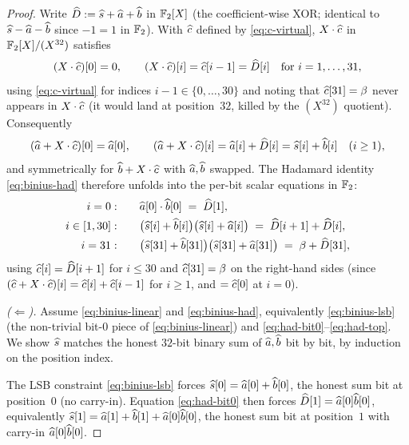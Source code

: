 \begin{proof}
Write $\widehat{D} := \widehat{s} + \widehat{a} + \widehat{b}$ in $\mathbb{F}_2[X]$ (the
coefficient-wise XOR; identical to $\widehat{s} - \widehat{a} - \widehat{b}$ since
$-1 = 1$ in $\mathbb{F}_2$). With $\widehat{c}$ defined by \eqref{eq:c-virtual},
$X\cdot\widehat{c}$ in $\mathbb{F}_2[X]/(X^{32})$ satisfies
\begin{equation}\label{eq:xc-bits}
(X\cdot\widehat{c})[0] = 0, \qquad
(X\cdot\widehat{c})[i] = \widehat{c}[i-1] = \widehat{D}[i] \quad \text{for } i = 1,\dots,31,
\end{equation}
using \eqref{eq:c-virtual} for indices $i-1 \in \{0,\dots,30\}$ and
noting that $\widehat{c}[31] = \beta$ never appears in $X\cdot\widehat{c}$ (it
would land at position~$32$, killed by the $(X^{32})$ quotient).
Consequently
\begin{equation*}
(\widehat{a} + X\cdot\widehat{c})[0] = \widehat{a}[0], \qquad
(\widehat{a} + X\cdot\widehat{c})[i] = \widehat{a}[i] + \widehat{D}[i] = \widehat{s}[i] + \widehat{b}[i]
\quad (i \geq 1),
\end{equation*}
and symmetrically for $\widehat{b} + X\cdot\widehat{c}$ with $\widehat{a}, \widehat{b}$
swapped. The Hadamard identity \eqref{eq:binius-had} therefore unfolds
into the per-bit scalar equations in $\mathbb{F}_2$:
\begin{align}
i = 0:&\qquad \widehat{a}[0]\cdot\widehat{b}[0] \;=\; \widehat{D}[1], \label{eq:had-bit0}\\
i \in [1, 30]:&\qquad \bigl(\widehat{s}[i]+\widehat{b}[i]\bigr)\bigl(\widehat{s}[i]+\widehat{a}[i]\bigr) \;=\; \widehat{D}[i+1] + \widehat{D}[i], \label{eq:had-mid}\\
i = 31:&\qquad \bigl(\widehat{s}[31]+\widehat{b}[31]\bigr)\bigl(\widehat{s}[31]+\widehat{a}[31]\bigr) \;=\; \beta + \widehat{D}[31], \label{eq:had-top}
\end{align}
using $\widehat{c}[i] = \widehat{D}[i+1]$ for $i \leq 30$ and $\widehat{c}[31] =
\beta$ on the right-hand sides (since $(\widehat{c} + X\cdot\widehat{c})[i] =
\widehat{c}[i] + \widehat{c}[i-1]$ for $i \geq 1$, and $= \widehat{c}[0]$ at $i = 0$).

\emph{($\Leftarrow$).} Assume \eqref{eq:binius-linear} and
\eqref{eq:binius-had}, equivalently \eqref{eq:binius-lsb} (the
non-trivial bit-$0$ piece of \eqref{eq:binius-linear}) and
\eqref{eq:had-bit0}--\eqref{eq:had-top}. We show $\widehat{s}$ matches the
honest $32$-bit binary sum of $\widehat{a}, \widehat{b}$ bit by bit, by
induction on the position index.

The LSB constraint \eqref{eq:binius-lsb} forces $\widehat{s}[0] = \widehat{a}[0]
+ \widehat{b}[0]$, the honest sum bit at position~$0$ (no carry-in).
Equation \eqref{eq:had-bit0} then forces $\widehat{D}[1] =
\widehat{a}[0]\widehat{b}[0]$, equivalently $\widehat{s}[1] = \widehat{a}[1] + \widehat{b}[1] +
\widehat{a}[0]\widehat{b}[0]$, the honest sum bit at position~$1$ with carry-in
$\widehat{a}[0]\widehat{b}[0]$.


\end{proof}
